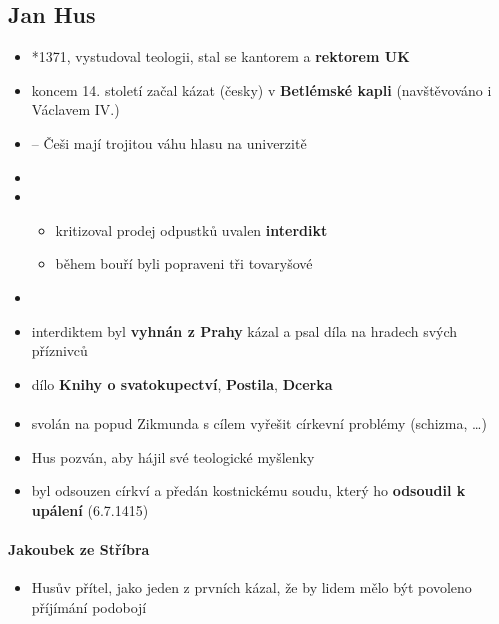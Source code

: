 \subsection{Jan Hus}
\begin{itemize}
\item *1371, vystudoval teologii, stal se kantorem a \textbf{rektorem UK}
\item koncem 14. století začal kázat (česky) v \textbf{Betlémské kapli} (navštěvováno i Václavem IV.)
\item {} -- Češi mají trojitou váhu hlasu na univerzitě
\item {}
\item {}
	\begin{itemize}
	\item kritizoval prodej odpustků \ra uvalen \textbf{interdikt}
	\item během bouří byli popraveni tři tovaryšové
	\end{itemize}
\item {}
\item interdiktem byl \textbf{vyhnán z Prahy} \ra kázal a psal díla na hradech svých příznivců
\item dílo \textbf{Knihy o svatokupectví}, \textbf{Postila}, \textbf{Dcerka}
\end{itemize}

\paragraph{}
\begin{itemize}
\item svolán na popud Zikmunda s cílem vyřešit církevní problémy (schizma, \ldots)
\item Hus pozván, aby hájil své teologické myšlenky
\item byl odsouzen církví a předán kostnickému soudu, který ho \textbf{odsoudil k upálení} (6.7.1415)
\end{itemize}

\paragraph{Jakoubek ze Stříbra}
\begin{itemize}
\item Husův přítel, jako jeden z prvních kázal, že by lidem mělo být povoleno příjímání podobojí
\end{itemize}



